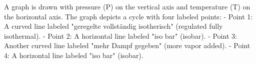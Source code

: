 A graph is drawn with pressure (P) on the vertical axis and temperature (T) on the horizontal axis. The graph depicts a cycle with four labeled points:  
- Point 1: A curved line labeled "geregelte vollständig isotherisch" (regulated fully isothermal).  
- Point 2: A horizontal line labeled "iso bar" (isobar).  
- Point 3: Another curved line labeled "mehr Dampf gegeben" (more vapor added).  
- Point 4: A horizontal line labeled "iso bar" (isobar).